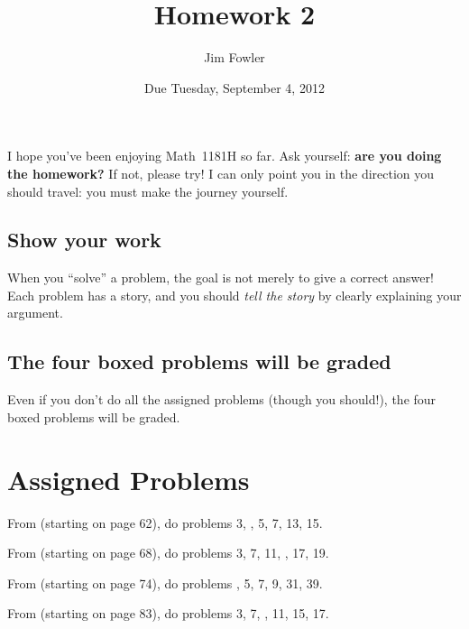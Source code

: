 \documentclass[12pt]{handout}
\title{Homework 2}
\date{Due Tuesday, September  4, 2012}
\author{Jim Fowler}
\begin{document}
\maketitle


I hope you've been enjoying
Math~1181H so far.  Ask yourself:
\textbf{are you doing the homework?}  If not, please try!  I can only
point you in the direction you should travel: you must make the
journey yourself.






\subsection*{Show your work}
When you ``solve'' a problem, the goal is not merely to give a correct answer!  Each problem has a story, and you should \textit{tell the story} by clearly explaining your argument.


\subsection*{The four boxed problems will be graded}
Even if you don't do all the assigned problems (though you should!), the four boxed problems will be graded.

\section*{Assigned Problems}

From  (starting on page 62),
do problems 3, , 5, 7, 13, 15.
\vspace{1ex}

From  (starting on page 68),
do problems 3, 7, 11, , 17, 19.
\vspace{1ex}

From  (starting on page 74),
do problems , 5, 7, 9, 31, 39.
\vspace{1ex}

From  (starting on page 83),
do problems 3, 7, , 11, 15, 17.
\vspace{1ex}
\end{document}
